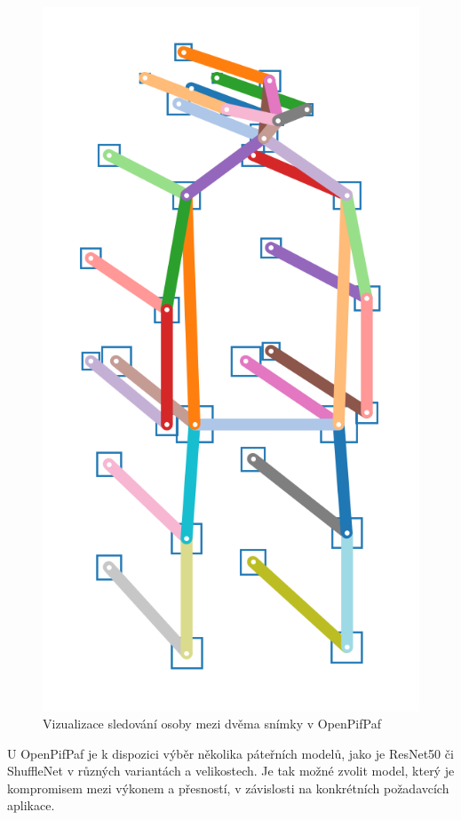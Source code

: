 \begin{figure}[]
    \centering
    \includegraphics[height=0.2\textheight]{Figures/skeleton_forward2.png}
    \caption{Vizualizace  sledování osoby mezi dvěma snímky v OpenPifPaf \cite{openpifpaf}}
    \label{fig:pipaf-tracking}
\end{figure}

U OpenPifPaf je k dispozici výběr několika páteřních modelů, jako je ResNet50
či ShuffleNet v různých variantách a velikostech. Je tak možné zvolit model,
který je kompromisem mezi výkonem a přesností, v závislosti na konkrétních
požadavcích aplikace.

